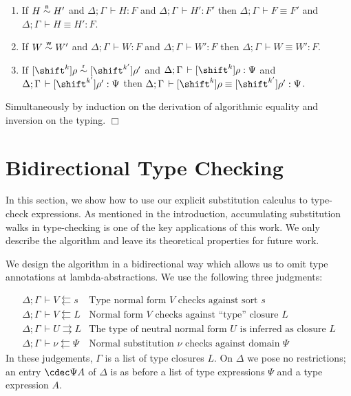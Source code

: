 \documentclass[copyright,creativecommons]{eptcs}
\def\squareforqed{\ensuremath{\Box}}
\def\qed{\ifmmode\squareforqed\else{\unskip\nobreak\hfil
\penalty50\hskip1em\null\nobreak\hfil\squareforqed
\parfillskip=0pt\finalhyphendemerits=0\endgraf}\fi}
\newenvironment{proof}[1][]{\noindent\ifthenelse{\equal{#1}{}}{{\it
      Proof.}}{{\it Proof #1.}}\hspace{2ex}}{\qed\bigskip}
\newcommand{\bla}{\ensuremath{\mbox{$$}}} \newcommand{\Fpure}{\ensuremath{\mathsf{F}}}
\newcommand{\der}{\,\vdash}
\newcommand{\shiftby}[1]{\shift^{#1}}
\newcommand{\esub}[1]{[#1]}
\newcommand{\alr}{\buildrel\mathsf{r}\over\sim}\newcommand{\Alr}{(\mathord{\alr})}
\newcommand{\alreq}[4]{\shiftEnv{#1}{#3} \alr \shiftEnv{#2}{#4}}
\newcommand{\alw}{\buildrel\mathsf{w}\over\sim}\newcommand{\Alw}{(\mathord{\alw})}
\newcommand{\aln}{\buildrel\mathsf{n}\over\sim}\newcommand{\Aln}{(\mathord{\aln})}
\newcommand{\shiftEnv}[1]{\esub{\shiftby{#1}}}
\newcommand{\jinf}{\rightrightarrows}
\newcommand{\jchk}{\leftleftarrows}
\begin{document}
\begin{theorem}\label{thm:soundeq} \bla
\begin{enumerate}
\item If $H \aln H'$ and $\Delta; \Gamma \der H : F$ and $\Delta;
  \Gamma \der H' : F'$ then $\Delta; \Gamma \der F \equiv F'$ and
  $\Delta; \Gamma \der H \equiv H' : F$. 
\item If $W \alw W'$ 
  and $\Delta; \Gamma \der W : F$ 
  and $\Delta; \Gamma \der W' : F$ 
then $\Delta; \Gamma \der W \equiv W' : F$.
\item If $\alreq k {k'} \rho {\rho'}$ 
  and $\Delta;\Gamma \der \shiftEnv k \rho : \Psi$
  and $\Delta;\Gamma \der \shiftEnv {k'}{\rho'} : \Psi$
then
  $\Delta;\Gamma \der \shiftEnv k \rho \equiv \shiftEnv {k'}{\rho'} : \Psi$.
\end{enumerate}
\end{theorem}
\begin{proof}
  Simultaneously by induction on the derivation of algorithmic
  equality and inversion on the typing.
\end{proof}


\section{Bidirectional Type Checking} 
\label{sec:bidir}
In this section, we show how to use our explicit substitution calculus
to type-check expressions. As mentioned in the introduction,
accumulating substitution walks in type-checking is one of the key
applications of this work. We only describe the algorithm and leave
its theoretical properties for future work.

We design the algorithm in a bidirectional way
\cite{coquand:type,abelCoquand:lfsigma} which allows us to omit
type annotations at lambda-abstractions. We use the following three judgments:


\[
\begin{array}{ll}
  \Delta; \Gamma \der V \jchk s & \mbox{Type normal form $V$ checks against
    sort $s$} \\
  \Delta; \Gamma \der V \jchk L & \mbox{Normal form $V$ checks against
    ``type'' closure $L$} \\
  \Delta; \Gamma \der U \jinf L & \mbox{The type of neutral normal
    form $U$ is inferred as closure $L$} 
\\[0.75em]
  \Delta; \Gamma \der \nu \jchk \Psi & \mbox{Normal substitution
    $\nu$ checks against domain $\Psi$} 
\end{array}
\]
In these judgements, $\Gamma$ is a list of type closures $L$.  On
$\Delta$ we pose no restrictions; an entry $\cdec \Psi A$ of $\Delta$
is as before a list of type expressions $\Psi$ and a type expression $A$.
 
\end{document}
